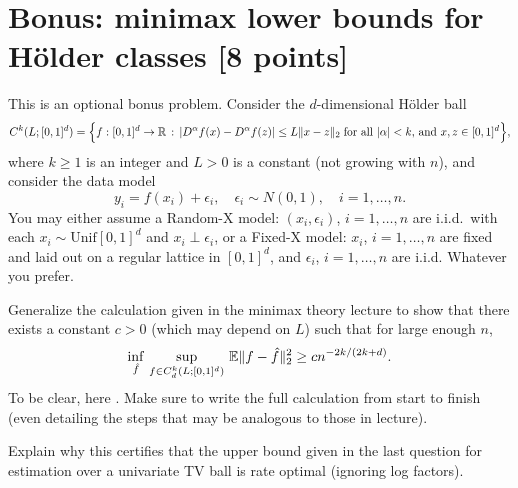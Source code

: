 \documentclass{article}
\begin{document}
\section{Bonus: minimax lower bounds for H{\"o}lder classes [8 points]}  

This is an optional bonus problem. Consider the $d$-dimensional H{\"o}lder ball    
\[
C^k(L; [0,1]^d) = \Big\{ f : [0,1]^d \to \mathbb{R} \,:\, | D^\alpha f (x) - D^\alpha
f(z) | \leq L \|x-z\|_2 \; \text{for all $|\alpha| < k$, and $x,z \in [0,1]^d$}
\Big\},  
\]
where $k \geq 1$ is an integer and $L>0$ is a constant (not growing with $n$),
and consider the data model 
\[
y_i = f(x_i) + \epsilon_i, \quad \epsilon_i \sim N(0,1), \quad i=1,\dots,n. 
\]
You may either assume a Random-X model: $(x_i,\epsilon_i)$, $i=1,\dots,n$ are 
i.i.d.\ with each $x_i \sim \mathrm{Unif}[0,1]^d$ and $x_i \perp \epsilon_i$,
or a Fixed-X model: $x_i$, $i=1,\dots,n$ are fixed and laid out on a regular
lattice in $[0,1]^d$, and $\epsilon_i$, $i=1,\dots,n$ are i.i.d. Whatever you
prefer.   

Generalize the calculation given in the minimax theory lecture to show that
there exists a constant $c>0$ (which may depend on $L$) such that for large
enough $n$,
\[
\inf_{\hat{f}} \, \sup_{f \in C^k_d(L; [0,1]^d)} \, \mathbb{E} \|f - \hat{f} \|_2^2 \geq
c n^{-2k/(2k+d)}. 
\]
To be clear, here . Make sure
to write the full calculation from start to finish (even detailing the steps
that may be analogous to those in lecture).  
\marginpar{\small [7 pts]}

Explain why this certifies that the upper bound given in the last question for
estimation over a univariate TV ball is rate optimal (ignoring log factors). 
\marginpar{\small [1 pt]}



\end{document}
